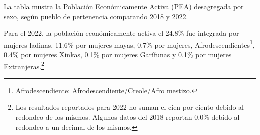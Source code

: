 La tabla mustra la Población Económicamente Activa (PEA) desagregada por sexo, según pueblo de pertenencia comparando 2018 y 2022.

 Para el 2022, la población económicamente activa el 24.8\% fue integrada por mujeres ladinas, 11.6\% por mujeres mayas, 0.7\% por mujeres, Afrodescendientes\footnote{Afrodescendiente: Afrodescendiente/Creole/Afro mestizo.}, 0.4\% por mujeres Xinkas, 0.1\% por mujeres Garífunas y 0.1\% por mujeres Extranjeras.\footnote{Los resultados reportados para 2022 no suman el cien por ciento debido al redondeo de los mismos. Algunos datos del 2018 reportan 0.0\% debido al redondeo a un decimal de los mismos.}

